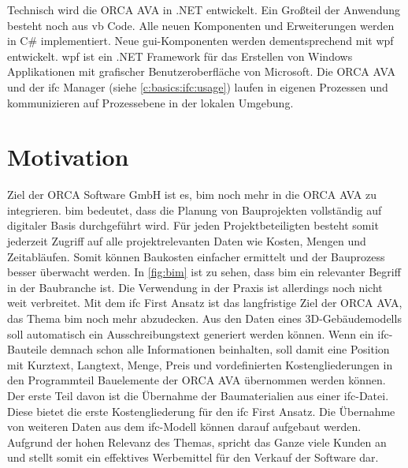Technisch wird die ORCA AVA in .NET entwickelt. Ein Großteil der Anwendung besteht noch aus \ac{vb} Code. Alle neuen Komponenten und Erweiterungen werden in C\# implementiert. Neue \ac{gui}-Komponenten werden dementsprechend mit \ac{wpf} entwickelt. \ac{wpf} ist ein .NET Framework für das Erstellen von Windows Applikationen mit grafischer Benutzeroberfläche von Microsoft. \citep[vgl.][]{Microsoft_2022} Die ORCA AVA und der \ac{ifc} Manager (siehe \autoref{c:basics:ifc:usage}) laufen in eigenen Prozessen und kommunizieren auf Prozessebene in der lokalen Umgebung. 

\section{Motivation}
\label{c:intro:motivation}

Ziel der \glqq ORCA Software GmbH\grqq{} ist es, \ac{bim} noch mehr in die ORCA AVA zu integrieren. \ac{bim} bedeutet, dass die Planung von Bauprojekten vollständig auf digitaler Basis durchgeführt wird.  Für jeden Projektbeteiligten besteht somit jederzeit Zugriff auf alle projektrelevanten Daten wie Kosten, Mengen und Zeitabläufen. Somit können Baukosten einfacher ermittelt und der Bauprozess besser überwacht werden. In \autoref{fig:bim} ist zu sehen, dass \ac{bim} ein relevanter Begriff in der Baubranche ist. Die Verwendung in der Praxis ist allerdings noch nicht weit verbreitet. \citep[vgl.][p.~20]{RolandBerger2016} Mit dem \glqq \ac{ifc} First\grqq{} Ansatz ist das langfristige Ziel der ORCA AVA, das Thema \ac{bim} noch mehr abzudecken. Aus den Daten eines 3D-Gebäudemodells soll automatisch ein Ausschreibungstext generiert werden können. Wenn ein \ac{ifc}-Bauteile demnach schon alle Informationen beinhalten, soll damit eine Position mit Kurztext, Langtext, Menge, Preis und vordefinierten Kostengliederungen in den Programmteil Bauelemente der ORCA AVA übernommen werden können. Der erste Teil davon ist die Übernahme der Baumaterialien aus einer \ac{ifc}-Datei. Diese bietet die erste Kostengliederung für den \glqq \ac{ifc} First\grqq{} Ansatz. Die Übernahme von weiteren Daten aus dem \ac{ifc}-Modell können darauf aufgebaut werden. Aufgrund der hohen Relevanz des Themas, spricht das Ganze viele Kunden an und stellt somit ein effektives Werbemittel für den Verkauf der Software dar. 

